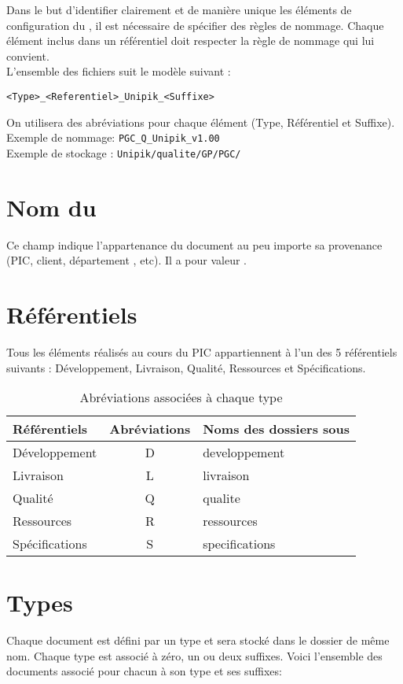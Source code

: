 Dans le but d'identifier clairement et de manière unique les éléments de configuration du \picCourt{}, il est nécessaire de spécifier des règles de nommage. Chaque élément inclus dans un référentiel doit respecter la règle de nommage qui lui convient.\\

L'ensemble des fichiers suit le modèle suivant :
\begin{center}
  \verb+<Type>_<Referentiel>_Unipik_<Suffixe>+
\end{center}
On utilisera des abréviations pour chaque élément (Type, Référentiel et Suffixe).\\
Exemple de nommage: \verb+PGC_Q_Unipik_v1.00+\\
Exemple de stockage : \verb+Unipik/qualite/GP/PGC/+


\section{Nom du \picCourt{}}
Ce champ indique l'appartenance du document au \PICCourt{} peu importe sa provenance
 (PIC, client, département \ASI{}, etc). Il a pour valeur \textbf{\nomEquipe}.

\section{Référentiels}

Tous les éléments réalisés au cours du PIC appartiennent à l'un des 5 référentiels suivants : Développement, Livraison, Qualité, Ressources et Spécifications.
\begin{table}[H]
\centering
	\begin{tabularx}{11cm}{|X|c|X|}
	\hline
	\rowcolor[gray]{0.85} Référentiels & Abréviations & Noms des dossiers sous \git{} \\
	\hline
	Développement & D & developpement\\
	\hline
	Livraison & L & livraison\\
	\hline
	Qualité & Q & qualite\\
	\hline	
	Ressources & R & ressources\\
	\hline 
	Spécifications & S & specifications\\ 
	\hline
	\end{tabularx}
\caption{Abréviations associées à chaque type}
\label{Référentiel}
\end{table}

\section{Types}
Chaque document est défini par un type et sera stocké dans le dossier de même nom. Chaque type est associé à zéro, un ou deux suffixes. Voici l'ensemble des documents associé pour chacun à son type et ses suffixes:

